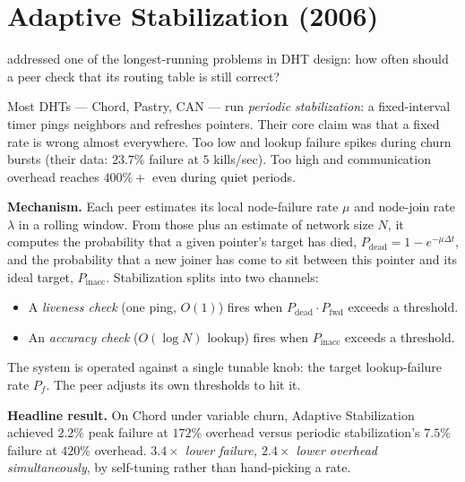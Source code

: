 \documentclass[twoside,nobib]{tufte-book}
\begin{document}
\section{Adaptive Stabilization (2006)}

addressed one of the longest-running problems in DHT design: how
often should a peer check that its routing table is still correct?

Most DHTs --- Chord, Pastry, CAN --- run \emph{periodic
stabilization}: a fixed-interval timer pings neighbors and refreshes
pointers. Their core claim was that a fixed rate is wrong almost
everywhere. Too low and lookup failure spikes during churn bursts
(their data: $23.7\%$ failure at $5$ kills/sec). Too high and
communication overhead reaches $400\%+$ even during quiet periods.

\textbf{Mechanism.} Each peer estimates its local node-failure rate
$\mu$ and node-join rate $\lambda$ in a rolling window. From those
plus an estimate of network size $N$, it computes the probability
that a given pointer's target has died, $P_{\mathrm{dead}} = 1 -
e^{-\mu \Delta t}$, and the probability that a new joiner has come
to sit between this pointer and its ideal target,
$P_{\mathrm{inacc}}$. Stabilization splits into two channels:

\begin{itemize}\setlength\itemsep{0.2em}
  \item A \emph{liveness check} (one ping, $O(1)$) fires when
    $P_{\mathrm{dead}} \cdot P_{\mathrm{fwd}}$ exceeds a threshold.
  \item An \emph{accuracy check} ($O(\log N)$ lookup) fires when
    $P_{\mathrm{inacc}}$ exceeds a threshold.
\end{itemize}

The system is operated against a single tunable knob: the target
lookup-failure rate $P_f$. The peer adjusts its own thresholds to
hit it.

\textbf{Headline result.} On Chord under variable churn, Adaptive
Stabilization achieved $2.2\%$ peak failure at $172\%$ overhead
versus periodic stabilization's $7.5\%$ failure at $420\%$
overhead. \emph{$3.4\times$ lower failure, $2.4\times$ lower
overhead simultaneously}, by self-tuning rather than hand-picking
a rate.
\end{document}
